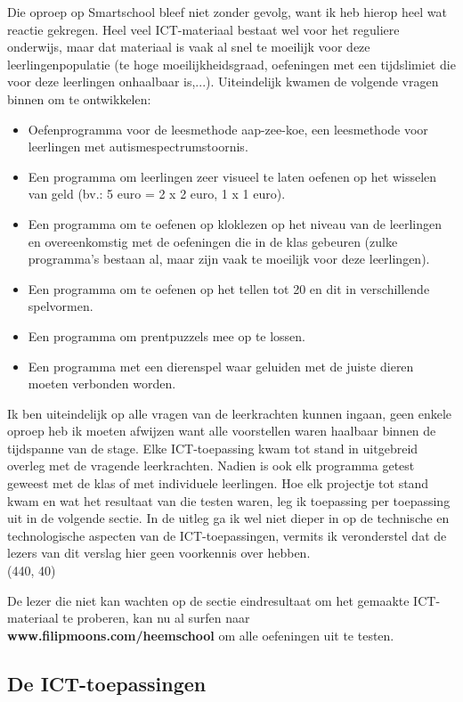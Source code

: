 \documentclass[a4paper,11pt]{article}
\theoremstyle{definition}
\begin{document}
\noindent Die oproep op Smartschool bleef niet zonder gevolg, want ik heb hierop heel wat reactie gekregen. Heel veel ICT-materiaal bestaat wel voor het reguliere onderwijs, maar dat materiaal is 
vaak al snel te moeilijk voor deze leerlingenpopulatie (te hoge moeilijkheidsgraad, oefeningen met een tijdslimiet die voor deze leerlingen onhaalbaar is,...). Uiteindelijk kwamen de volgende vragen binnen om te ontwikkelen:
\begin{itemize}
\item Oefenprogramma voor de leesmethode aap-zee-koe, een leesmethode voor leerlingen met 
autismespectrumstoornis.
\item Een programma om leerlingen zeer visueel te laten oefenen op het wisselen van geld (bv.: 5 euro = 2 x 2 euro, 1 x 1 euro).
\item Een programma om te oefenen op kloklezen op het niveau van de leerlingen en overeenkomstig met de oefeningen die in de klas gebeuren (zulke programma's bestaan al, maar zijn vaak te moeilijk voor deze leerlingen).
\item Een programma om te oefenen op het tellen tot 20 en dit in verschillende spelvormen.
\item Een programma om prentpuzzels mee op te lossen.
\item Een programma met een dierenspel waar geluiden met de juiste dieren moeten 
verbonden worden.
\end{itemize}
Ik ben uiteindelijk op alle vragen van de leerkrachten kunnen ingaan, geen enkele oproep heb ik moeten afwijzen want alle voorstellen waren haalbaar binnen de tijdspanne van de stage. 
Elke ICT-toepassing kwam tot stand in uitgebreid overleg met de vragende 
leerkrachten. Nadien is ook elk programma getest geweest met de klas of met 
individuele leerlingen. Hoe elk projectje tot stand kwam en wat het resultaat 
van die testen waren, leg ik toepassing per toepassing uit in de volgende sectie. In 
de uitleg ga ik wel niet dieper in op de technische en technologische aspecten van de ICT-toepassingen, 
vermits ik veronderstel dat de lezers van dit verslag hier geen voorkennis over 
hebben.\\

\noindent\framebox(440, 40){ 
\parbox{430\unitlength}{De lezer die niet kan wachten op de sectie eindresultaat om het gemaakte ICT-materiaal te proberen, kan nu al surfen
naar \textbf{www.filipmoons.com/heemschool} om alle oefeningen uit te testen.}
}
\subsection{De ICT-toepassingen}
\end{document}

